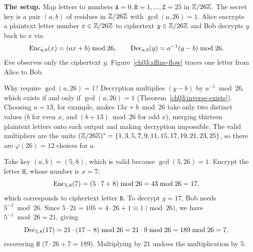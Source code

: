 \begin{intuitionbox}
\textbf{The setup.} Map letters to numbers $\texttt{A}=0, \texttt{B}=1, \dots, \texttt{Z}=25$ in $\mathbb{Z}/26\mathbb{Z}$. The secret key is a pair $(a, b)$ of residues in $\mathbb{Z}/26\mathbb{Z}$ with $\gcd(a,26)=1$. Alice encrypts a plaintext letter number $x \in \mathbb{Z}/26\mathbb{Z}$ to ciphertext $y \in \mathbb{Z}/26\mathbb{Z}$ and Bob decrypts $y$ back to $x$ via
\[
  \operatorname{Enc}_{a,b}(x) = (a x + b) \bmod 26, \qquad \operatorname{Dec}_{a,b}(y) = a^{-1}(y - b) \bmod 26.
\]
Eve observes only the ciphertext $y$. Figure~\ref{ch03:affine-flow} traces one letter from Alice to Bob.
\end{intuitionbox}

Why require $\gcd(a,26)=1$? Decryption multiplies $(y - b)$ by $a^{-1} \bmod 26$, which exists if and only if $\gcd(a,26) = 1$ (Theorem~\ref{ch03:inverse-exists}). Choosing $a = 13$, for example, makes $13x + b \bmod 26$ take only two distinct values ($b$ for even $x$, and $(b+13) \bmod 26$ for odd $x$), merging thirteen plaintext letters onto each output and making decryption impossible. The valid multipliers are the units $(\mathbb{Z}/26\mathbb{Z})^{*} = \{1,3,5,7,9,11,15,17,19,21,23,25\}$, so there are $\varphi(26) = 12$ choices for $a$.

\begin{example}
\label{ch03:affine-trace}
Take key $(a,b) = (5, 8)$, which is valid because $\gcd(5,26)=1$. Encrypt the letter $\texttt{H}$, whose number is $x = 7$:
\[
  \operatorname{Enc}_{5,8}(7) = (5\cdot 7 + 8) \bmod 26 = 43 \bmod 26 = 17,
\]
which corresponds to ciphertext letter $\texttt{R}$. To decrypt $y = 17$, Bob needs $5^{-1} \bmod 26$. Since $5 \cdot 21 = 105 = 4\cdot 26 + 1 \equiv 1 \pmod{26}$, we have $5^{-1} \bmod 26 = 21$, giving
\[
  \operatorname{Dec}_{5,8}(17) = 21\cdot(17 - 8) \bmod 26 = 21\cdot 9 \bmod 26 = 189 \bmod 26 = 7,
\]
recovering $\texttt{H}$ ($7\cdot 26 + 7 = 189$). Multiplying by $21$ undoes the multiplication by $5$.
\end{example}

